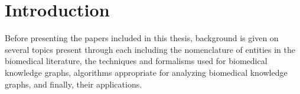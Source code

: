 \chapter{Introduction}
\label{ch:introduction}

Before presenting the papers included in this thesis, background is given on several topics present through each including the nomenclature of entities in the biomedical literature, the techniques and formalisms used for biomedical knowledge graphs, algorithms appropriate for analyzing biomedical knowledge graphs, and finally, their applications.





